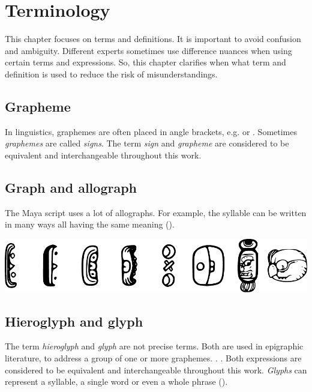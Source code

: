 \documentclass[../main.tex]{subfiles}
\begin{document}
\chapter{Terminology}
This chapter focuses on terms and definitions.
It is important to avoid confusion and ambiguity.
Different experts sometimes use difference nuances when using certain terms and expressions.
So, this chapter clarifies when what term and definition is used to reduce the risk of
misunderstandings.

\section{Grapheme}
In linguistics, graphemes are often placed in angle brackets, e.g.  or .
Sometimes \emph{graphemes} are called \emph{signs}.
The term \emph{sign} and \emph{grapheme} are considered to be equivalent and 
interchangeable throughout this work.

\section{Graph and allograph}
The Maya script uses a lot of allographs.
For example, the syllable  can be written in many ways all having the same meaning 
().
\begin{center}
    \includegraphics[width=\textwidth,keepaspectratio]{img/grapheme-u-allographs}
    \label{fig:terminology-grapheme-u-allographs}
\end{center}

\section{Hieroglyph and glyph}
The term \emph{hieroglyph} and \emph{glyph} are not precise terms.
Both are used in epigraphic literature, to address a group of one or more graphemes.
.
. 
Both expressions are considered to be equivalent and interchangeable throughout this work.
\emph{Glyphs} can represent a syllable, a single word or even a whole phrase 
(\cite[23]{macrilooper2003}).
\end{document}
